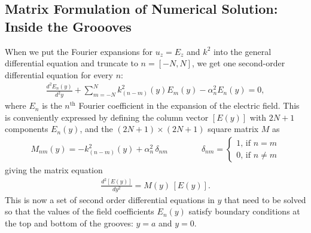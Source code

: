 \subsection{Matrix Formulation of Numerical Solution: Inside the Groooves}
When we put the Fourier expansions for $u_z = E_z$  and $k^2$  into the general differential equation  and truncate to $n=[-N, N]$, we get one second-order differential equation for every $n$:
\begin{align}
\frac{d^2 E_n(y)}{d^2y} + \sum \limits_{m=-N}^{N} k^2_{(n-m)}(y) E_m(y) - \alpha_n^2 E_n(y) = 0,
\end{align}
where $E_n$ is the $n^\textrm{th}$ Fourier coefficient in the expansion of the electric field.  This is conveniently expressed by defining the column vector $\left[E(y)\right]$ with $2N+1$ components $E_n(y)$, and the $(2N+1)\times(2N+1)$ square matrix $M$ as
\begin{align}
M_{nm}(y) = -k^2_{(n-m)}(y) + \alpha^2_n \,\delta_{nm}  \qquad \qquad \delta_{nm} = \left\{ \begin{array}{c}1 \textrm{, if } n=m \\0 \textrm{, if } n\neq m\end{array}\right.
\end{align}
giving the matrix equation
\begin{align}
\label{matrixDE}
\frac{d^2 \left[E(y)\right]}{dy^2} = M(y) \, \left[E(y)\right].
\end{align}
This is now a set of second order differential equations in $y$ that need to be solved so that the values of the field coefficients $E_n(y)$ satisfy boundary conditions at the top and bottom of the grooves: $y=a$ and $y=0$.

